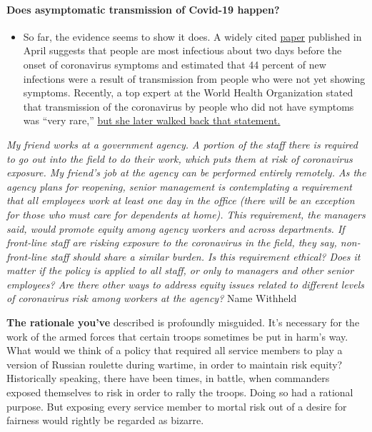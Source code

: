 \begin{itemize}
{  \paragraph{Does asymptomatic transmission of Covid-19
  happen?}\label{does-asymptomatic-transmission-of-covid-19-happen}}

  \begin{itemize}
  \tightlist
  \item
    So far, the evidence seems to show it does. A widely cited
    \href{https://www.nature.com/articles/s41591-020-0869-5}{paper}
    published in April suggests that people are most infectious about
    two days before the onset of coronavirus symptoms and estimated that
    44 percent of new infections were a result of transmission from
    people who were not yet showing symptoms. Recently, a top expert at
    the World Health Organization stated that transmission of the
    coronavirus by people who did not have symptoms was ``very rare,''
    \href{https://www.nytimes3xbfgragh.onion/2020/06/09/world/coronavirus-updates.html?action=click\&pgtype=Article\&state=default\&region=MAIN_CONTENT_3\&context=storylines_faq\#link-1f302e21}{but
    she later walked back that statement.}
  \end{itemize}
\end{itemize}

\emph{My friend works at a government agency. A portion of the staff
there is required to go out into the field to do their work, which puts
them at risk of coronavirus exposure. My friend's job at the agency can
be performed entirely remotely. As the agency plans for reopening,
senior management is contemplating a requirement that all employees work
at least one day in the office (there will be an exception for those who
must care for dependents at home). This requirement, the managers said,
would promote equity among agency workers and across departments. If
front-line staff are risking exposure to the coronavirus in the field,
they say, non-front-line staff should share a similar burden. Is this
requirement ethical? Does it matter if the policy is applied to all
staff, or only to managers and other senior employees? Are there other
ways to address equity issues related to different levels of coronavirus
risk among workers at the agency?} Name Withheld

\textbf{The rationale you've} described is profoundly misguided. It's
necessary for the work of the armed forces that certain troops sometimes
be put in harm's way. What would we think of a policy that required all
service members to play a version of Russian roulette during wartime, in
order to maintain risk equity? Historically speaking, there have been
times, in battle, when commanders exposed themselves to risk in order to
rally the troops. Doing so had a rational purpose. But exposing every
service member to mortal risk out of a desire for fairness would rightly
be regarded as bizarre.

